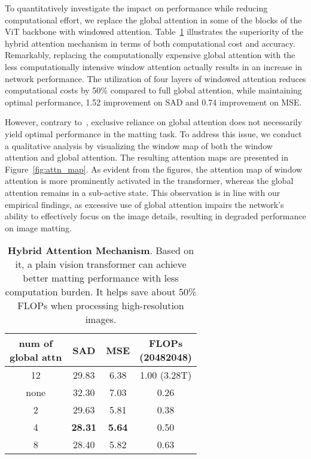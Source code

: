 \documentclass[10pt,twocolumn,letterpaper]{article}
\begin{document}
To quantitatively investigate the impact on performance while reducing computational effort, we replace the global attention in some of the blocks of the ViT backbone with windowed attention. Table~\ref{tab:hybrid} illustrates the superiority of the hybrid attention mechanism in terms of both computational cost and accuracy. Remarkably, replacing the computationally expensive global attention with the less computationally intensive window attention actually results in an increase in network performance. The utilization of four layers of windowed attention reduces computational costs by 50\% compared to full global attention, while maintaining optimal performance, 1.52 improvement on SAD and 0.74 improvement on MSE.

However, contrary to~\cite{vitdet}, exclusive reliance on global attention does not necessarily yield optimal performance in the matting task. To address this issue, we conduct a qualitative analysis by visualizing the window map of both the window attention and global attention. The resulting attention maps are presented in Figure~\ref{fig:attn_map}. As evident from the figures, the attention map of window attention is more prominently activated in the transformer, whereas the global attention remains in a sub-active state. This observation is in line with our empirical findings, as excessive use of global attention impairs the network's ability to effectively focus on the image details, resulting in degraded performance on image matting.

\begin{table}[tbp]
    \centering
    \renewcommand{\arraystretch}{1.1}
    \begin{tabular}{c|ccc}
        \toprule
        \makecell[c]{num of \\ global attn} & \multicolumn{1}{c}{SAD} & \multicolumn{1}{c}{MSE} &\makecell[c]{FLOPs \\ (20482048)} \\
        \midrule
        12   & 29.83          & 6.38                & 1.00 (3.28T) \\
        \midrule
        none & 32.30         & 7.03                & 0.26 \\
        2    & 29.63        & 5.81              & 0.38 \\
        4    & \textbf{28.31} & \textbf{5.64}       & 0.50 \\
        8    & 28.40          & 5.82                & 0.63 \\
        \bottomrule
    \end{tabular}
    \caption{\textbf{Hybrid Attention Mechanism}. Based on it, a plain vision transformer can achieve better matting performance with less computation burden. It helps save about 50\% FLOPs when processing high-resolution images.}
    \label{tab:hybrid}
\end{table}
\end{document}

